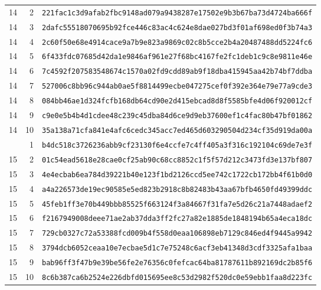 \begin{tabular}{@{}rrl@{}}
14 & 2 & \texttt{221fac1c3d9afab2fbc9148ad079a9438287e17502e9b3b67ba73d4724ba666f} \\
14 & 3 & \texttt{2dafc55518070695b92fce446c83ac4c624e8dae027bd3f01af698ed0f3b74a3} \\
14 & 4 & \texttt{2c60f50e68e4914cace9a7b9e823a9869c02c8b5cce2b4a20487488dd5224fc6} \\
14 & 5 & \texttt{6f433fdc07685d42da1e9846af961e27f68bc4167fe2fc1deb1c9c8e9811e46e} \\
14 & 6 & \texttt{7c4592f207583548674c1570a02fd9cdd89ab9f18dba415945aa42b74bf7ddba} \\
14 & 7 & \texttt{527006c8bb96c944ab0ae5f8814499ecbe047275cef0f392e364e79e77a9cde3} \\
14 & 8 & \texttt{084bb46ae1d324fcfb168db64cd90e2d415ebcad8d8f5585bfe4d06f920012cf} \\
14 & 9 & \texttt{c9e0e5b4b4d1cdee48c239c45dba84d6ce9d9eb37600ef1c4fac80b47bf01862} \\
14 & 10 & \texttt{35a138a71cfa841e4afc6cedc345acc7ed465d603290504d234cf35d919da00a} \\
\addlinespace
15 & 1 & \texttt{b4dc518c3726236abb9cf23130f6e4ccfe7c4ff405a3f316c192104c69de7e3f} \\
15 & 2 & \texttt{01c54ead5618e28cae0cf25ab90c68cc8852c1f5f57d212c3473fd3e137bf807} \\
15 & 3 & \texttt{4e4ecbab6ea784d39221b40e123f1bd2126ccd5ee742c1722cb172bb4f61b0d0} \\
15 & 4 & \texttt{a4a226573de19ec90585e5ed823b2918c8b82483b43aa67bfb4650fd49399ddc} \\
15 & 5 & \texttt{45feb1ff3e70b449bbb85525f663124f3a84667f31fa7e5d26c21a7448adaef2} \\
15 & 6 & \texttt{f2167949008deee71ae2ab37dda3ff2fc27a82e1885de1848194b65a4eca18dc} \\
15 & 7 & \texttt{729cb0327c72a53388fcd009b4f558d0eaa106898eb7129c846ed4f9445a9942} \\
15 & 8 & \texttt{3794dcb6052ceaa10e7ecbae5d1c7e75248c6acf3eb41348d3cdf3325afa1baa} \\
15 & 9 & \texttt{bab96ff3f47b9e39be56fe2e76356c0fefcac64ba81787611b892169dc2b85f6} \\
15 & 10 & \texttt{8c6b387ca6b2524e226dbfd015695ee8c53d2982f520dc0e59ebb1faa8d223fc} \\
\bottomrule
\end{tabular}
